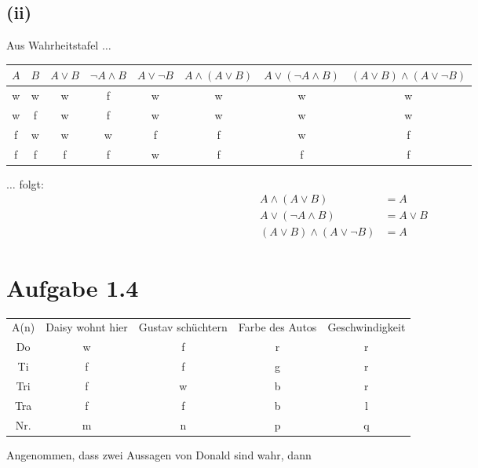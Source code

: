 \documentclass{article}
\begin{document}
\subsection*{(ii)}

Aus Wahrheitstafel \(\ldots\)
\begin{center}
\begin{tabular}{ c  c c c c c c c }
  \(A\) & \(B\) & \(A \lor B\) & \(\neg A \wedge B\) & \(A \lor \neg B\)
  & \(A \wedge (A \lor B)\) & \(A \lor (\neg A \wedge B) \)
  & \((A \lor B) \wedge (A \lor \neg B) \) \\
  \hline
  w & w & w & f & w & w & w & w \\
  w & f & w & f & w & w & w & w \\
  f & w & w & w & f & f & w & f \\
  f & f & f & f & w & f & f & f \\
\end{tabular}
\end{center}

\(\ldots\) folgt:
\begin{align*}
  A \wedge (A \lor B) &= A\\
  A \lor (\neg A \wedge B) &= A \lor B\\
  (A \lor B) \wedge (A \lor \neg B) &= A
\end{align*}

\section*{Aufgabe 1.4}
\begin{center}
  \begin{tabular}{ c c c c c }
    A(n) & Daisy wohnt hier & Gustav schüchtern & Farbe des Autos &
                                                                    Geschwindigkeit \\
    Do & w & f & r & r\\
    Ti & f & f & g & r\\
    Tri & f & w & b & r\\
    Tra & f & f & b & l\\
    Nr. & m & n & p & q\\
\end{tabular}
\end{center}

Angenommen, dass zwei Aussagen von Donald sind wahr, dann
\end{document}
